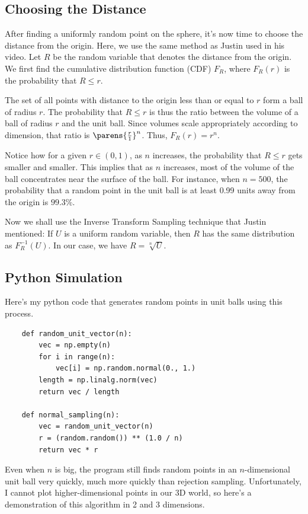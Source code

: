 \documentclass{article}
\begin{document}
\subsection{Choosing the Distance}

After finding a uniformly random point on the sphere, it's now time to choose the distance from the origin. Here, we use the same method as Justin used in his video. Let $R$ be the random variable that denotes the distance from the origin. We first find the cumulative distribution function (CDF) $F_R$, where $F_R(r)$ is the probability that $R \leq r$.

The set of all points with distance to the origin less than or equal to $r$ form a ball of radius $r$. The probability that $R \leq r$ is thus the ratio between the volume of a ball of radius $r$ and the unit ball. Since volumes scale appropriately according to dimension, that ratio is $\parens{\frac{r}{1}}^n$. Thus, $F_R(r) = r^n$.

Notice how for a given $r \in (0, 1)$, as $n$ increases, the probability that $R \leq r$ gets smaller and smaller. This implies that as $n$ increases, most of the volume of the ball concentrates near the surface of the ball. For instance, when $n = 500$, the probability that a random point in the unit ball is at least 0.99 units away from the origin is $99.3\%$.

Now we shall use the Inverse Transform Sampling technique that Justin mentioned: If $U$ is a uniform random variable, then $R$ has the same distribution as $F_R^{-1}(U)$. In our case, we have $R = \sqrt[n]{U}$.

\subsection{Python Simulation}

Here's my python code that generates random points in unit balls using this process.

\begin{verbatim}
    def random_unit_vector(n):
        vec = np.empty(n)
        for i in range(n):
            vec[i] = np.random.normal(0., 1.)
        length = np.linalg.norm(vec)
        return vec / length
    
    def normal_sampling(n):
        vec = random_unit_vector(n)
        r = (random.random()) ** (1.0 / n)
        return vec * r
\end{verbatim}

Even when $n$ is big, the program still finds random points in an $n$-dimensional unit ball very quickly, much more quickly than rejection sampling. Unfortunately, I cannot plot higher-dimensional points in our 3D world, so here's a demonstration of this algorithm in 2 and 3 dimensions.
\end{document}
